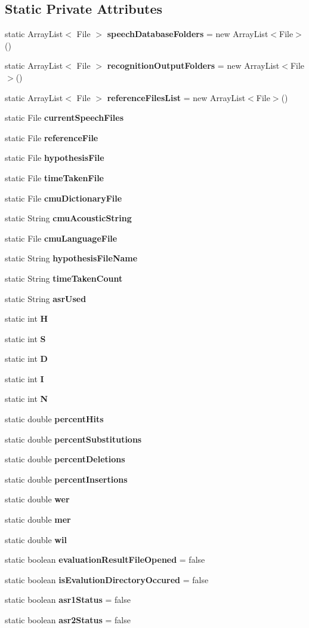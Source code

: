 \subsection*{Static Private Attributes}
\begin{DoxyCompactItemize}
\item 
static Array\+List$<$ File $>$ {\bf speech\+Database\+Folders} = new Array\+List$<$File$>$()
\item 
static Array\+List$<$ File $>$ {\bf recognition\+Output\+Folders} = new Array\+List$<$File$>$()
\item 
static Array\+List$<$ File $>$ {\bf reference\+Files\+List} = new Array\+List$<$File$>$()
\item 
static File {\bf current\+Speech\+Files}
\item 
static File {\bf reference\+File}
\item 
static File {\bf hypothesis\+File}
\item 
static File {\bf time\+Taken\+File}
\item 
static File {\bf cmu\+Dictionary\+File}
\item 
static String {\bf cmu\+Acoustic\+String}
\item 
static File {\bf cmu\+Language\+File}
\item 
static String {\bf hypothesis\+File\+Name}
\item 
static String {\bf time\+Taken\+Count}
\item 
static String {\bf asr\+Used}
\item 
static int {\bf H}
\item 
static int {\bf S}
\item 
static int {\bf D}
\item 
static int {\bf I}
\item 
static int {\bf N}
\item 
static double {\bf percent\+Hits}
\item 
static double {\bf percent\+Substitutions}
\item 
static double {\bf percent\+Deletions}
\item 
static double {\bf percent\+Insertions}
\item 
static double {\bf wer}
\item 
static double {\bf mer}
\item 
static double {\bf wil}
\item 
static boolean {\bf evaluation\+Result\+File\+Opened} = false
\item 
static boolean {\bf is\+Evalution\+Directory\+Occured} = false
\item 
static boolean {\bf asr1\+Status} = false
\item 
static boolean {\bf asr2\+Status} = false
\end{DoxyCompactItemize}


